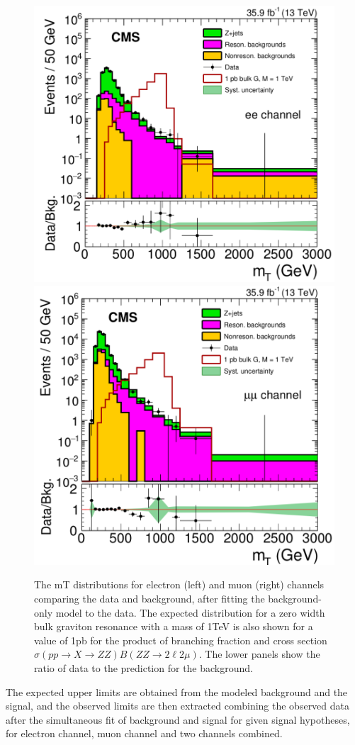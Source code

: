 \begin{figure}[htbp]
\begin{center}
\includegraphics[width=0.49\linewidth]{figures/sys_elSRuncMT.png}
\includegraphics[width=0.49\linewidth]{figures/sys_muSRuncMT.png}
\caption{The mT distributions for electron (left) and muon (right) channels comparing the data and background, after fitting the background-only model to the data. The expected distribution for a zero width bulk graviton resonance with a mass of 1TeV is also shown for a value of 1pb for the product of branching fraction and cross section $\sigma(pp\rightarrow X\rightarrow ZZ)B(ZZ\rightarrow 2\ell 2\mu)$. The lower panels show the ratio of data to the prediction for the background.}
\label{fig:sys_uncMT}
\end{center}
\end{figure}

\vspace{0.3cm}
The expected upper limits are obtained from the modeled background and the signal, and the observed limits are then extracted combining the observed data after the simultaneous fit of background and signal for given signal hypotheses, for electron channel, muon channel and two channels combined. 

